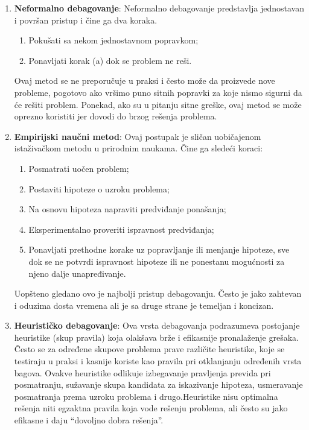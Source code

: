 \documentclass[a4paper]{article}
\begin{document}
\begin{enumerate}
	\item \textbf{Neformalno debagovanje}: Neformalno debagovanje predstavlja jednostavan i površan pristup i čine ga dva koraka.
	\begin{enumerate}
		\item Pokušati sa nekom jednostavnom popravkom;
		\item Ponavljati korak (a) dok se problem ne reši.
	\end{enumerate}
	Ovaj metod se ne preporučuje u praksi i često može da proizvede nove probleme, pogotovo ako vršimo puno sitnih popravki za koje nismo sigurni da će rešiti problem. Ponekad, ako su u pitanju sitne greške, ovaj metod se može oprezno koristiti jer dovodi do brzog rešenja problema.\cite{bagovi_smalkov}
	
	\item \textbf{Empirijski naučni metod}:
	Ovaj postupak je sličan uobičajenom istaživačkom metodu u prirodnim naukama.
	Čine ga sledeći koraci:
	\begin{enumerate}
		\item Posmatrati uočen problem;
		\item Postaviti hipoteze o uzroku problema;
		\item Na osnovu hipoteza napraviti predviđanje ponašanja;
		\item Eksperimentalno proveriti ispravnost predviđanja;
		\item Ponavljati prethodne korake uz popravljanje ili menjanje hipoteze, sve dok se ne potvrdi ispravnost hipoteze ili ne ponestanu mogućnosti za njeno dalje unapređivanje.
	\end{enumerate}
	\indent Uopšteno gledano ovo je najbolji pristup debagovanju. Često je jako zahtevan i oduzima dosta vremena ali je sa druge strane je temeljan i koncizan.\cite{bagovi_smalkov}
	
	
	\item \textbf{Heurističko debagovanje}:
	Ova vrsta debagovanja podrazumeva postojanje heuristike (skup pravila) koja olakšava brže i efikasnije pronalaženje grešaka. Često se za određene skupove problema prave različite heuristike, koje se testiraju u praksi i kasnije koriste kao pravila pri otklanjanju određenih vrsta bagova. Ovakve heuristike odlikuje izbegavanje pravljenja previda pri posmatranju, sužavanje skupa kandidata za iskazivanje hipoteza, usmeravanje posmatranja prema uzroku problema i drugo.Heuristike nisu optimalna rešenja niti egzaktna pravila koja vode rešenju problema, ali često su jako efikasne i daju “dovoljno dobra rešenja”.\cite{bagovi_smalkov}
\end{enumerate}
\end{document}
